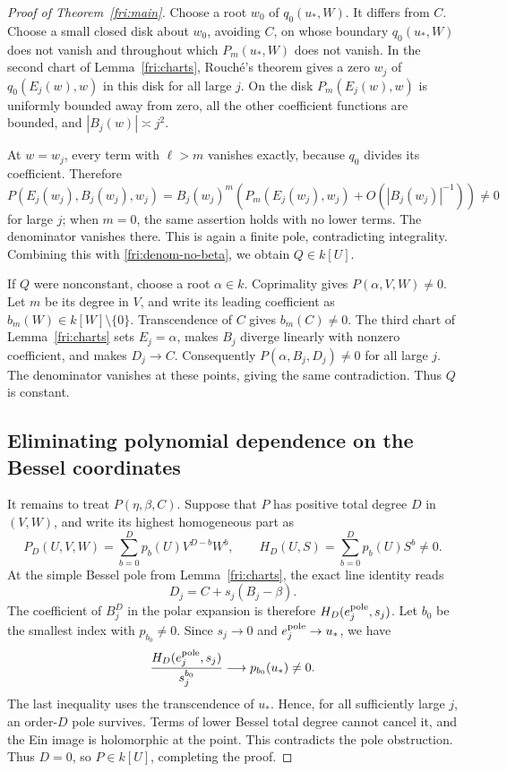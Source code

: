 \documentclass[11pt]{article}
\theoremstyle{definition}
\theoremstyle{remark}
\begin{document}
\begin{proof}[Proof of Theorem~\ref{fri:main}]
Choose a root $w_0$ of $q_0(u_*,W)$.  It differs from $C$.  Choose
a small closed disk about $w_0$, avoiding $C$, on whose boundary
$q_0(u_*,W)$ does not vanish and throughout which $P_m(u_*,W)$
does not vanish.  In the second chart of Lemma~\ref{fri:charts},
Rouch\'e's theorem gives a zero $w_j$ of $q_0(E_j(w),w)$ in this
disk for all large $j$.  On the disk $P_m(E_j(w),w)$ is uniformly
bounded away from zero, all the other coefficient functions are
bounded, and $|B_j(w)|\asymp j^2$.

At $w=w_j$, every term with $\ell>m$ vanishes exactly, because
$q_0$ divides its coefficient.  Therefore
\[
 P(E_j(w_j),B_j(w_j),w_j)
 =B_j(w_j)^m\left(P_m(E_j(w_j),w_j)+O(|B_j(w_j)|^{-1})\right)
 \ne0
\]
for large $j$; when $m=0$, the same assertion holds with no lower
terms.  The denominator vanishes there.  This is again a finite
pole, contradicting integrality.  Combining this with
\eqref{fri:denom-no-beta}, we obtain $Q\in k[U]$.

If $Q$ were nonconstant, choose a root $\alpha\in k$.  Coprimality
gives $P(\alpha,V,W)\ne0$.  Let $m$ be its degree in $V$, and
write its leading coefficient as $b_m(W)\in k[W]\setminus\{0\}$.
Transcendence of $C$ gives $b_m(C)\ne0$.  The third chart of
Lemma~\ref{fri:charts} sets $E_j=\alpha$, makes $B_j$ diverge
linearly with nonzero coefficient, and makes $D_j\to C$.
Consequently $P(\alpha,B_j,D_j)\ne0$ for all large $j$.
The denominator vanishes at these points, giving the same
contradiction.  Thus $Q$ is constant.

\subsection*{Eliminating polynomial dependence on the Bessel coordinates}

It remains to treat $P(\eta,\beta,C)$.  Suppose that $P$ has
positive total degree $D$ in $(V,W)$, and write its highest
homogeneous part as
\[
 P_D(U,V,W)=\sum_{b=0}^{D}p_b(U)V^{D-b}W^b,
 \qquad
 H_D(U,S)=\sum_{b=0}^{D}p_b(U)S^b\ne0.
\]
At the simple Bessel pole from Lemma~\ref{fri:charts}, the exact
line identity reads
\[
 D_j=C+s_j(B_j-\beta).
\]
The coefficient of $B_j^D$ in the polar expansion is therefore
$H_D(e_j^{\rm pole},s_j)$.  Let $b_0$ be the smallest index with
$p_{b_0}\ne0$.  Since $s_j\to0$ and
$e_j^{\rm pole}\to u_*$, we have
\[
 \frac{H_D(e_j^{\rm pole},s_j)}{s_j^{b_0}}
 \longrightarrow p_{b_0}(u_*)\ne0.
\]
The last inequality uses the transcendence of $u_*$.  Hence, for
all sufficiently large $j$, an order-$D$ pole survives.  Terms of
lower Bessel total degree cannot cancel it, and the Ein image is
holomorphic at the point.  This contradicts the pole obstruction.
Thus $D=0$, so $P\in k[U]$, completing the proof.
\end{proof}
\end{document}
